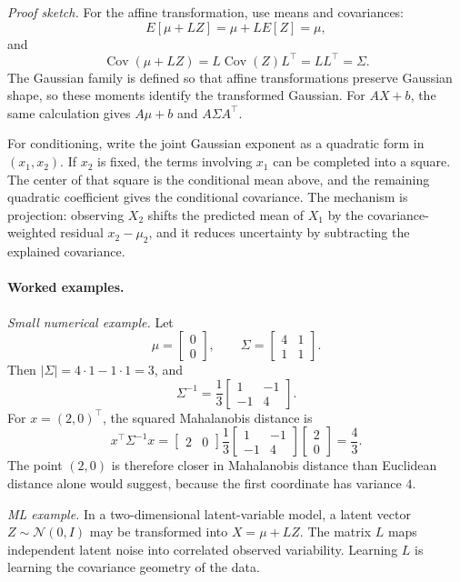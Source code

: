 \emph{Proof sketch.}
For the affine transformation, use means and covariances:
\[
E[\mu+LZ]=\mu+LE[Z]=\mu,
\]
and
\[
\operatorname{Cov}(\mu+LZ)=L\operatorname{Cov}(Z)L^\top=LL^\top=\Sigma.
\]
The Gaussian family is defined so that affine transformations preserve Gaussian shape, so these moments identify the transformed Gaussian. For \(AX+b\), the same calculation gives \(A\mu+b\) and \(A\Sigma A^\top\).

For conditioning, write the joint Gaussian exponent as a quadratic form in \((x_1,x_2)\). If \(x_2\) is fixed, the terms involving \(x_1\) can be completed into a square. The center of that square is the conditional mean above, and the remaining quadratic coefficient gives the conditional covariance. The mechanism is projection: observing \(X_2\) shifts the predicted mean of \(X_1\) by the covariance-weighted residual \(x_2-\mu_2\), and it reduces uncertainty by subtracting the explained covariance.

\paragraph{Worked examples.}
\emph{Small numerical example.} Let
\[
\mu=
\begin{bmatrix}0\\0\end{bmatrix},
\qquad
\Sigma=
\begin{bmatrix}
4 & 1\\
1 & 1
\end{bmatrix}.
\]
Then \(|\Sigma|=4\cdot1-1\cdot1=3\), and
\[
\Sigma^{-1}
=\frac{1}{3}
\begin{bmatrix}
1 & -1\\
-1 & 4
\end{bmatrix}.
\]
For \(x=(2,0)^\top\), the squared Mahalanobis distance is
\[
x^\top\Sigma^{-1}x
=
\begin{bmatrix}2 & 0\end{bmatrix}
\frac{1}{3}
\begin{bmatrix}
1 & -1\\
-1 & 4
\end{bmatrix}
\begin{bmatrix}2\\0\end{bmatrix}
=\frac{4}{3}.
\]
The point \((2,0)\) is therefore closer in Mahalanobis distance than Euclidean distance alone would suggest, because the first coordinate has variance \(4\).

\emph{ML example.} In a two-dimensional latent-variable model, a latent vector \(Z\sim\mathcal N(0,I)\) may be transformed into \(X=\mu+LZ\). The matrix \(L\) maps independent latent noise into correlated observed variability. Learning \(L\) is learning the covariance geometry of the data.

